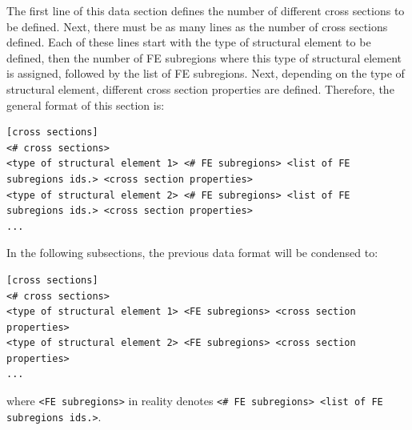 \documentclass[a4paper,fleqn]{book}
\begin{document}
The first line of this data section defines the number of different cross sections to be defined. Next, there must be as many lines as the number of cross sections defined. Each of these lines start with the type of structural element to be defined, then the number of FE subregions where this type of structural element is assigned, followed by the list of FE subregions. Next, depending on the type of structural element, different cross section properties are defined. Therefore, the general format of this section is:
\begin{Verbatim}[frame=single, fontsize=\footnotesize, label={general format of section [cross sections]}]
[cross sections]
<# cross sections>
<type of structural element 1> <# FE subregions> <list of FE subregions ids.> <cross section properties>
<type of structural element 2> <# FE subregions> <list of FE subregions ids.> <cross section properties>
...
\end{Verbatim} 
In the following subsections, the previous data format will be condensed to:
\begin{Verbatim}[frame=single, fontsize=\footnotesize, label={general format of section [cross sections]}]
[cross sections]
<# cross sections>
<type of structural element 1> <FE subregions> <cross section properties>
<type of structural element 2> <FE subregions> <cross section properties>
...
\end{Verbatim} 
where \texttt{<FE subregions>} in reality denotes \texttt{<\# FE subregions> <list of FE subregions ids.>}.
\end{document}
